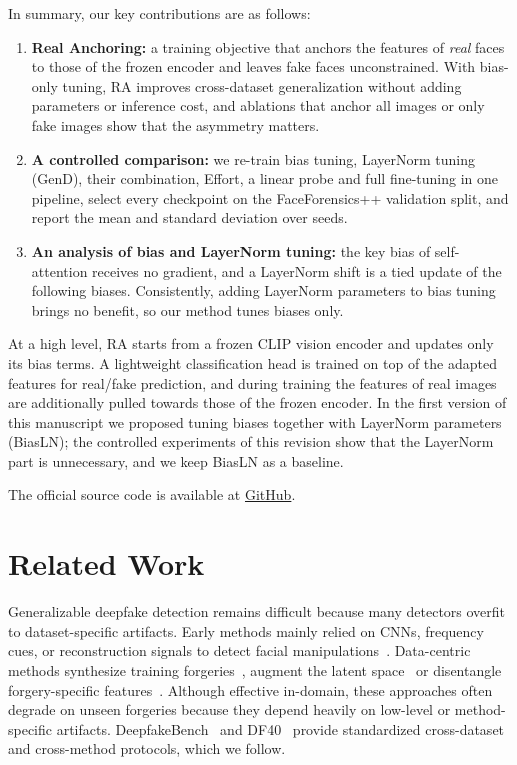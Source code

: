\documentclass[fonts]{icst}
\begin{document}
In summary, our key contributions are as follows:
\begin{enumerate}
    \item \textbf{Real Anchoring:} a training objective that anchors the features of \emph{real} faces to those of the frozen encoder and leaves fake faces unconstrained. With bias-only tuning, RA improves cross-dataset generalization without adding parameters or inference cost, and ablations that anchor all images or only fake images show that the asymmetry matters.

    \item \textbf{A controlled comparison:} we re-train bias tuning, LayerNorm tuning (GenD), their combination, Effort, a linear probe and full fine-tuning in one pipeline, select every checkpoint on the FaceForensics++ validation split, and report the mean and standard deviation over seeds.

    \item \textbf{An analysis of bias and LayerNorm tuning:} the key bias of self-attention receives no gradient, and a LayerNorm shift is a tied update of the following biases. Consistently, adding LayerNorm parameters to bias tuning brings no benefit, so our method tunes biases only.
\end{enumerate}
At a high level, RA starts from a frozen CLIP vision encoder and updates only its bias terms. A lightweight classification head is trained on top of the adapted features for real/fake prediction, and during training the features of real images are additionally pulled towards those of the frozen encoder.
In the first version of this manuscript we proposed tuning biases together with LayerNorm parameters (BiasLN); the controlled experiments of this revision show that the LayerNorm part is unnecessary, and we keep BiasLN as a baseline.

The official source code is available at \href{https://github.com/dinhxuanhuy/BiasLN}{GitHub}.


\section{Related Work}

Generalizable deepfake detection remains difficult because many detectors overfit to dataset-specific artifacts. Early methods mainly relied on CNNs, frequency cues, or reconstruction signals to detect facial manipulations~\cite{rossler2019ff,qian2020frequency,luo2021srm,liu2021spsl,cao2022recce}. Data-centric methods synthesize training forgeries~\cite{shiohara2022sbi,chen2022sladd,lin2024cdfa}, augment the latent space~\cite{yan2024latent} or disentangle forgery-specific features~\cite{yan2023ucf,huang2023iid}. Although effective in-domain, these approaches often degrade on unseen forgeries because they depend heavily on low-level or method-specific artifacts. DeepfakeBench~\cite{yan2023deepfakebench} and DF40~\cite{yan2024df40} provide standardized cross-dataset and cross-method protocols, which we follow.
\end{document}
